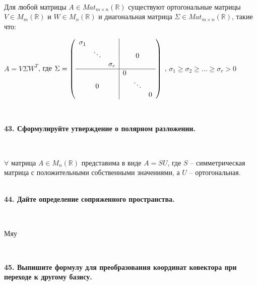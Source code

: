 \documentclass{article}
\begin{document}
    {
        $\;$
        \setlength{\parindent}{0.4cm}
        \hangindent=0.4cm

    Для любой матрицы $A \in Mat_{m \times n}(\mathbb{R})$ существуют ортогональные матрицы $V \in M_m(\mathbb{R})$ и $W \in M_n(\mathbb{R})$ и диагональная матрица $\Sigma \in Mat_{m \times n}(\mathbb{R})$, такие что:

        \begin{center}
            $
            A = V\Sigma W^T
            $, где
            $\Sigma = \left(
            \begin{array}{ccc|ccc}
                \sigma_1 &        &          &   &        &   \\
                & \ddots &          &   & 0      &   \\
                &        & \sigma_r &   &        &   \\
                \hline
                &        &          & 0 &        &   \\
                & 0      &          &   & \ddots &   \\
                &        &          &   &        & 0
            \end{array} \right)
            $ , $\sigma_1 \ge \sigma_2 \ge \ldots \ge \sigma_r > 0$

        \end{center}

        $\;$
        \setlength{\parindent}{0cm}
        \hangindent=0cm
    }


    \textbf{43. Сформулируйте утверждение о полярном разложении.}

    {
        $\;$
        \setlength{\parindent}{0.4cm}
        \hangindent=0.4cm

        $\forall$ матрица $A\in M_n(\mathbb{R})$ представима в виде $A=SU$, где $S$ -- симметрическая матрица с положительными собственными значениями, а $U$ -- ортогональная.\\

        $\;$
        \setlength{\parindent}{0cm}
        \hangindent=0cm
    }

    \textbf{44. Дайте определение сопряженного пространства.}

    {
        $\;$
        \setlength{\parindent}{0.4cm}
        \hangindent=0.4cm

        Мяу

        $\;$
        \setlength{\parindent}{0cm}
        \hangindent=0cm
    }


    \textbf{45. Выпишите формулу для преобразования координат ковектора при переходе к другому базису.}
\end{document}
